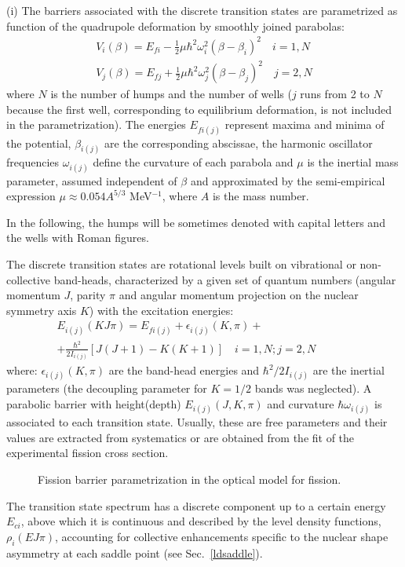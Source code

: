 \documentclass[twocolumn,amsmath,amssymb,10pt,groupedaddress,letter]{revtex4}
\begin{document}
(i) The barriers associated with the discrete transition states are parametrized
as function of the quadrupole deformation by smoothly joined parabolas:
\begin{eqnarray}
V_{i}(\beta)=E_{fi}-\frac{1}{2}\mu\hbar^{2}\omega_{i}^{2}(\beta
-\beta_{i})^{2}\quad i=1,N \nonumber\\
V_{j}(\beta)=E_{fj}+\frac{1}{2}\mu\hbar^{2}\omega_{j}^{2}(\beta
-\beta_{j})^{2} \quad j=2,N
\label{vfund0}%
\end{eqnarray}
where $N$ is the number of humps and the number of wells ($j$ runs from 2 to $N$
because the first well, corresponding to equilibrium deformation, is not included in
the parametrization).
The energies $E_{fi(j)}$ represent maxima and minima
of the potential, $\beta_{i(j)}$ are the corresponding abscissae, the harmonic
oscillator frequencies $\omega_{i(j)}$ define the curvature of each parabola and $\mu$ is
the inertial mass parameter, assumed independent of $\beta$ and approximated
by the semi-empirical expression $\mu\approx0.054A^{5/3}$ MeV${}^{-1}$,
where $A$ is the mass number.

In the following, the humps will be sometimes denoted with capital letters and
the wells with Roman figures.

The discrete transition states are rotational levels built on vibrational or
non-collective band-heads, characterized by a given set of quantum numbers
(angular momentum $J$, parity $\pi$ and angular momentum projection on the
nuclear symmetry axis $K$) with the excitation energies:
%
\begin{eqnarray}
E_{i(j)}(KJ\pi)=E_{fi(j)}+\epsilon_{i(j)}(K,\pi)+\qquad\qquad\qquad\qquad\\
+\frac{\hbar^{2}}{2I_{i(j)}}[J(J+1)-K(K+1)]\quad i=1,N; j=2,N\nonumber
\label{tsrot}%
\end{eqnarray}
%
where: $\epsilon_{i(j)}(K,\pi)$ are the band-head energies and $\hbar^{2}/2I_{i(j)}$ are
the inertial parameters (the decoupling parameter for $K=1/2$ bands was neglected).
A parabolic barrier with height(depth) $E_{i(j)}(J,K,\pi)$ and curvature $\hbar
\omega_{i(j)}$ is associated to each transition state. Usually, these are free parameters
and their values are extracted from systematics or are obtained from the fit of
the experimental fission cross section.
%
%
\begin{figure}[htbp]
\caption{Fission barrier parametrization in the optical model for fission.}
\label{fis-bar}
\end{figure}
%
The transition state spectrum has a discrete component up to a certain energy
$E_{ci}$, above which it is continuous and described by the level density
functions, $\rho_{i}(EJ\pi)$, accounting for collective enhancements specific
to the nuclear shape asymmetry at each saddle point (see Sec.~\ref{ldsaddle}).
\end{document}
